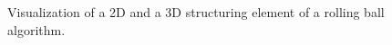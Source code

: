 \begin{figure}[H]
    \centering
    \qquad
    \caption{Visualization of a 2D and a 3D structuring element of a rolling ball algorithm.}
    \label{fig:rolling-ball}
\end{figure}


